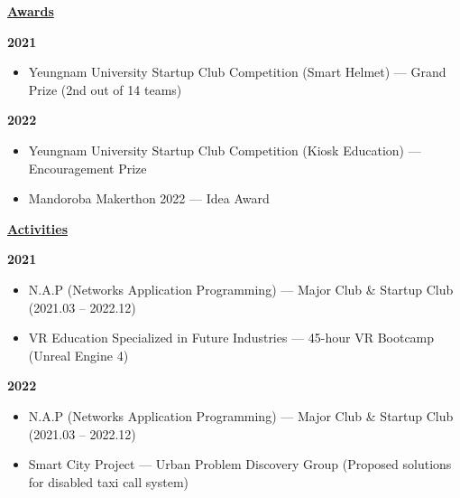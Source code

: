 \documentclass[a4paper, 10pt]{article}
\begin{document}
\vspace{2pt}
\noindent
\textbf{\underline{Awards}}

\vspace{2pt}
\noindent
\textbf{2021}

\begin{itemize}
  \setlength{\itemsep}{1pt}
  \setlength{\parskip}{0pt}
  \item Yeungnam University Startup Club Competition (Smart Helmet) — Grand Prize (2nd out of 14 teams)
\end{itemize}

\vspace{2pt}
\noindent
\textbf{2022}

\begin{itemize}
  \setlength{\itemsep}{1pt}
  \setlength{\parskip}{0pt}
  \item Yeungnam University Startup Club Competition (Kiosk Education) — Encouragement Prize
  \item Mandoroba Makerthon 2022 — Idea Award
\end{itemize}

\vspace{4pt}
\noindent
\textbf{\underline{Activities}}

\vspace{2pt}
\noindent
\textbf{2021}

\begin{itemize}
  \setlength{\itemsep}{1pt}
  \setlength{\parskip}{0pt}
  \item N.A.P (Networks Application Programming) — Major Club \& Startup Club (2021.03 -- 2022.12)
  \item VR Education Specialized in Future Industries — 45-hour VR Bootcamp (Unreal Engine 4)
\end{itemize}

\vspace{2pt}
\noindent
\textbf{2022}

\begin{itemize}
  \setlength{\itemsep}{1pt}
  \setlength{\parskip}{0pt}
  \item N.A.P (Networks Application Programming) — Major Club \& Startup Club (2021.03 -- 2022.12)
  \item Smart City Project — Urban Problem Discovery Group (Proposed solutions for disabled taxi call system)
\end{itemize}

\end{document}
